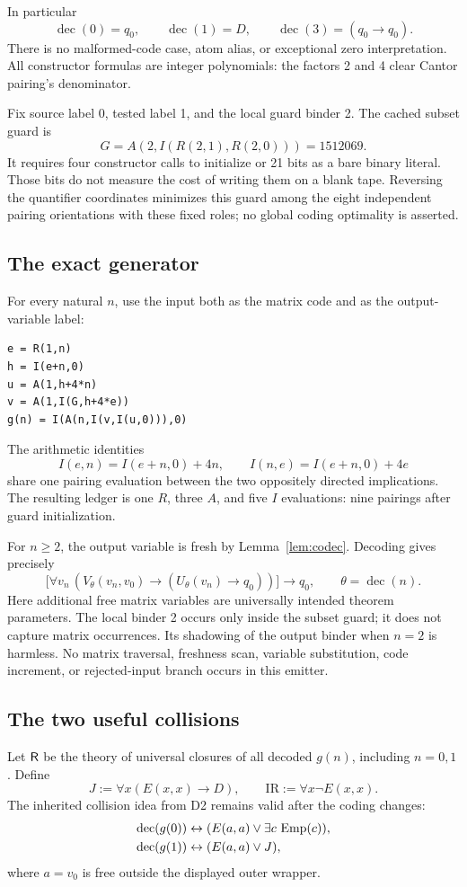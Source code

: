 In particular
\[
 \operatorname{dec}(0)=q_0,
 \qquad\operatorname{dec}(1)=D,
 \qquad\operatorname{dec}(3)=(q_0\to q_0).
\]
There is no malformed-code case, atom alias, or exceptional zero interpretation. All constructor formulas are integer polynomials: the factors 2 and 4 clear Cantor pairing's denominator.

Fix source label 0, tested label 1, and the local guard binder 2. The cached subset guard is
\[
 G=A(2,I(R(2,1),R(2,0)))=1512069.
\]
It requires four constructor calls to initialize or 21 bits as a bare binary literal. Those bits do not measure the cost of writing them on a blank tape. Reversing the quantifier coordinates minimizes this guard among the eight independent pairing orientations with these fixed roles; no global coding optimality is asserted.

\subsection{The exact generator}

For every natural $n$, use the input both as the matrix code and as the output-variable label:
\begin{lstlisting}
e = R(1,n)
h = I(e+n,0)
u = A(1,h+4*n)
v = A(1,I(G,h+4*e))
g(n) = I(A(n,I(v,I(u,0))),0)
\end{lstlisting}
The arithmetic identities
\[
 I(e,n)=I(e+n,0)+4n,\qquad
 I(n,e)=I(e+n,0)+4e
\]
share one pairing evaluation between the two oppositely directed implications. The resulting ledger is one $R$, three $A$, and five $I$ evaluations: nine pairings after guard initialization.

For $n\ge2$, the output variable is fresh by Lemma~\ref{lem:codec}. Decoding gives precisely
\[
 \bigl[\forall v_n\,(V_\theta(v_n,v_0)
                      \to(U_\theta(v_n)\to q_0))\bigr]\to q_0,
 \qquad\theta=\operatorname{dec}(n).
\]
Here additional free matrix variables are universally intended theorem parameters. The local binder 2 occurs only inside the subset guard; it does not capture matrix occurrences. Its shadowing of the output binder when $n=2$ is harmless. No matrix traversal, freshness scan, variable substitution, code increment, or rejected-input branch occurs in this emitter.

\subsection{The two useful collisions}

Let $\mathsf{R}$ be the theory of universal closures of all decoded $g(n)$, including $n=0,1$. Define
\[
 J:=\forall x(E(x,x)\to D),\qquad
 \mathrm{IR}:=\forall x\neg E(x,x).
\]
The inherited collision idea from D2 remains valid after the coding changes:
\begin{equation}\label{eq:collisions}
 \begin{aligned}
  \operatorname{dec}(g(0))&\leftrightarrow
                  (E(a,a)\lor\exists c\,\operatorname{Emp}(c)),\\
  \operatorname{dec}(g(1))&\leftrightarrow(E(a,a)\lor J),
 \end{aligned}
\end{equation}
where $a=v_0$ is free outside the displayed outer wrapper.

